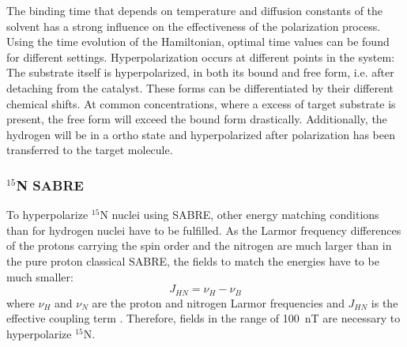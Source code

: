             The binding time that depends on temperature and diffusion constants of the solvent has a strong influence on the effectiveness of the polarization process. Using the time evolution of the Hamiltonian, optimal time values can be found for different settings.
            Hyperpolarization occurs at different points in the system: The substrate itself is hyperpolarized, in both its bound and free form, i.e. after detaching from the catalyst. These forms can be differentiated by their different chemical shifts. At common concentrations, where a excess of target substrate is present, the free form will exceed the bound form drastically. Additionally, the hydrogen will be in a ortho state and hyperpolarized after polarization has been transferred to the target molecule. 
        \subsubsection{$^{15}$N SABRE}
        \label{sec:theory:15nSabre}
        To hyperpolarize $^{15}$N nuclei using SABRE, other energy matching conditions than for hydrogen nuclei have to be fulfilled. As the Larmor frequency differences of the protons carrying the spin order and the nitrogen are much larger than in the pure proton classical SABRE, the fields to match the energies have to be much smaller:
        \begin{equation}
            J_{HN} = \nu_H - \nu_B
        \end{equation}
        where $\nu_H$ and $\nu_N$ are the proton and nitrogen Larmor frequencies and $J_{HN}$ is the effective coupling term \cite{truong_15n_2015-1}. Therefore, fields in the range of \SI{100}{\nano\tesla} are necessary to hyperpolarize $^{15}$N.
